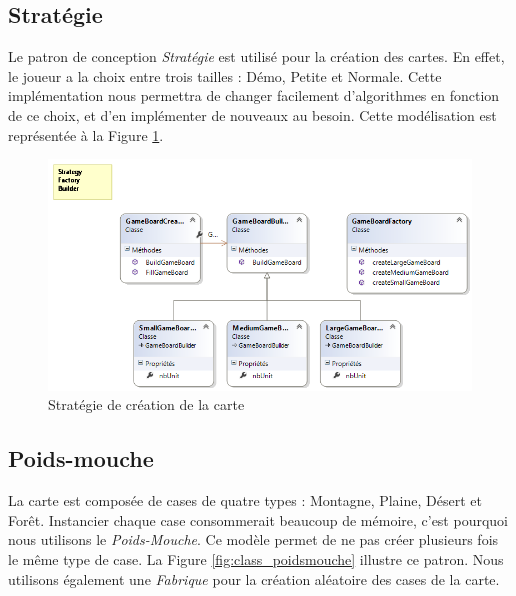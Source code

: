 \documentclass[a4paper]{article}
\begin{document}
\clearpage
	\subsection{Stratégie}
Le patron de conception \textit{Stratégie} est utilisé pour la création des cartes. En effet, le joueur a la choix entre trois tailles : Démo, Petite et Normale. Cette implémentation nous permettra de changer facilement d'algorithmes en fonction de ce choix, et d'en implémenter de nouveaux au besoin. Cette modélisation est représentée à la Figure \ref{fig:class_strategy}.

\begin{figure}[ht]
\centering
	\includegraphics[width=\textwidth]{../Schemas/class_GameBoardBuilder_Strategy.png}
		\caption{Stratégie de création de la carte}
		\label{fig:class_strategy}
\end{figure}

\clearpage
	\subsection{Poids-mouche}
La carte est composée de cases de quatre types : Montagne, Plaine, Désert et Forêt. Instancier chaque case consommerait beaucoup de mémoire, c'est pourquoi nous utilisons le \textit{Poids-Mouche}. Ce modèle permet de ne pas créer plusieurs fois le même type de case. La Figure \ref{fig:class_poidsmouche} illustre ce patron. Nous utilisons également une \textit{Fabrique} pour la création aléatoire des cases de la carte.
\end{document}
